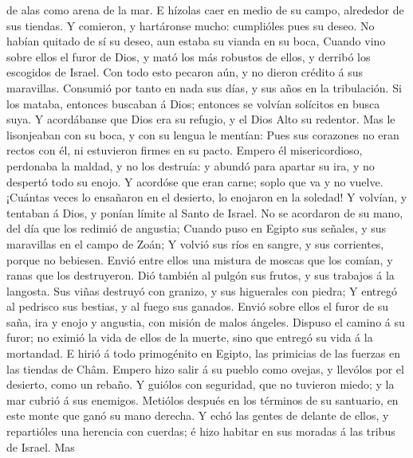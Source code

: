 de alas como arena de la mar.  E hízolas caer en medio de
su campo, alrededor de sus tiendas.  Y comieron, y
hartáronse mucho: cumplióles pues su deseo.  No habían
quitado de sí su deseo, aun estaba su vianda en su boca, 
Cuando vino sobre ellos el furor de Dios, y mató los más robustos de
ellos, y derribó los escogidos de Israel.  Con todo esto
pecaron aún, y no dieron crédito á sus maravillas. 
Consumió por tanto en nada sus días, y sus años en la tribulación.
 Si los mataba, entonces buscaban á Dios; entonces se
volvían solícitos en busca suya.  Y acordábanse que Dios
era su refugio, y el Dios Alto su redentor.  Mas le
lisonjeaban con su boca, y con su lengua le mentían:  Pues
sus corazones no eran rectos con él, ni estuvieron firmes en su pacto.
 Empero él misericordioso, perdonaba la maldad, y no los
destruía: y abundó para apartar su ira, y no despertó todo su enojo.
 Y acordóse que eran carne; soplo que va y no vuelve.
 ¡Cuántas veces lo ensañaron en el desierto, lo enojaron en
la soledad!  Y volvían, y tentaban á Dios, y ponían límite
al Santo de Israel.  No se acordaron de su mano, del día
que los redimió de angustia;  Cuando puso en Egipto sus
señales, y sus maravillas en el campo de Zoán;  Y volvió
sus ríos en sangre, y sus corrientes, porque no bebiesen. 
Envió entre ellos una mistura de moscas que los comían, y ranas que los
destruyeron.  Dió también al pulgón sus frutos, y sus
trabajos á la langosta.  Sus viñas destruyó con granizo, y
sus higuerales con piedra;  Y entregó al pedrisco sus
bestias, y al fuego sus ganados.  Envió sobre ellos el
furor de su saña, ira y enojo y angustia, con misión de malos ángeles.
 Dispuso el camino á su furor; no eximió la vida de ellos
de la muerte, sino que entregó su vida á la mortandad.  E
hirió á todo primogénito en Egipto, las primicias de las fuerzas en las
tiendas de Châm.  Empero hizo salir á su pueblo como
ovejas, y llevólos por el desierto, como un rebaño.  Y
guiólos con seguridad, que no tuvieron miedo; y la mar cubrió á sus
enemigos.  Metiólos después en los términos de su
santuario, en este monte que ganó su mano derecha.  Y echó
las gentes de delante de ellos, y repartióles una herencia con cuerdas;
é hizo habitar en sus moradas á las tribus de Israel.  Mas
